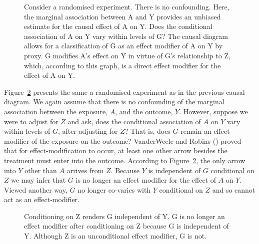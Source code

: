 \documentclass[
  singlecolumn]{article}
\begin{document}
\begin{figure}


\caption{\label{fig-eff-mod-rel}Consider a randomised experiment. There
is no confounding. Here, the marginal association between A and Y
provides an unbiased estimate for the causal effect of A on Y. Does the
conditional association of A on Y vary within levels of G? The causal
diagram allows for a classification of G as an effect modifier of A on Y
by proxy. G modifies A's effect on Y in virtue of G's relationship to Z,
which, according to this graph, is a direct effect modifier for the
effect of A on Y.}

\end{figure}%

Figure~\ref{fig-dag-effect-modification-4} presents the same a
randomised experiment as in the previous causal diagram. We again assume
that there is no confounding of the marginal association between the
exposure, \(A\), and the outcome, \(Y\). However, suppose we were to
adjust for \(Z\) and ask, does the conditional association of \(A\) on
\(Y\) vary within levels of \(G\), after adjusting for \(Z\)? That is,
does \(G\) remain an effect-modifier of the exposure on the outcome?
VanderWeele and Robins () proved
that for effect-modification to occur, at least one other arrow besides
the treatment must enter into the outcome. According to
Figure~\ref{fig-dag-effect-modification-4}, the only arrow into \(Y\)
other than \(A\) arrives from \(Z\). Because \(Y\) is independent of
\(G\) conditional on \(Z\) we may infer that \(G\) is no longer an
effect modifier for the effect of \(A\) on \(Y\). Viewed another way,
\(G\) no longer co-varies with \(Y\) conditional on \(Z\) and so cannot
act as an effect-modifier.

\begin{figure}


\caption{\label{fig-dag-effect-modification-4}Conditioning on Z renders
G independent of Y. G is no longer an effect modifier after conditioning
on Z because G is independent of Y. Although Z is an unconditional
effect modifier, G is not.}

\end{figure}%
\end{document}
